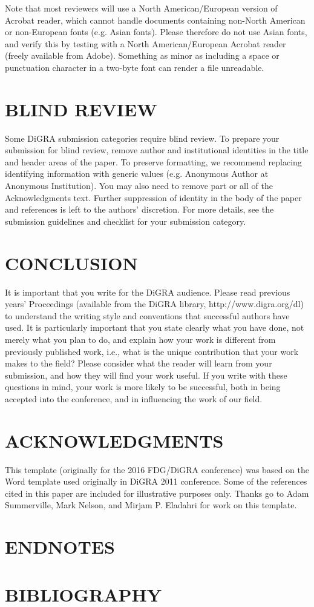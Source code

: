 \documentclass[11pt]{article}
\begin{document}
Note that most reviewers will use a North American/European version of Acrobat reader,
which cannot handle documents containing non-North American or non-European fonts
(e.g. Asian fonts). Please therefore do not use Asian fonts, and verify this by testing with
a North American/European Acrobat reader (freely available from Adobe). Something as
minor as including a space or punctuation character in a two-byte font can render a file
unreadable.
\section*{BLIND REVIEW}
Some DiGRA submission categories require blind review. To prepare your submission
for blind review, remove author and institutional identities in the title and header areas of
the paper. To preserve formatting, we recommend replacing identifying information with
generic values (e.g. Anonymous Author at Anonymous Institution). You may also need to
remove part or all of the Acknowledgments text. Further suppression of identity in the
body of the paper and references is left to the authors' discretion. For more details, see the
submission guidelines and checklist for your submission category.
\section*{CONCLUSION}
It is important that you write for the DiGRA audience. Please read previous years'
Proceedings (available from the DiGRA library, http://www.digra.org/dl) to understand
the writing style and conventions that successful authors have used. It is particularly
important that you state clearly what you have done, not merely what you plan to do, and
explain how your work is different from previously published work, i.e., what is the
unique contribution that your work makes to the field? Please consider what the reader 
will learn from your submission, and how they will find your work useful. If you write
with these questions in mind, your work is more likely to be successful, both in being
accepted into the conference, and in influencing the work of our field.
\section*{ACKNOWLEDGMENTS}
This template (originally for the 2016 FDG/DiGRA conference) was based on the Word template used originally in DiGRA 2011 conference. Some of the references cited in this paper are included for illustrative
purposes only. Thanks go to Adam Summerville, Mark Nelson, and Mirjam P. Eladahri for work on this template.
\section*{ENDNOTES}
\theendnotes

\section*{BIBLIOGRAPHY}
\printbibliography
\end{document}
